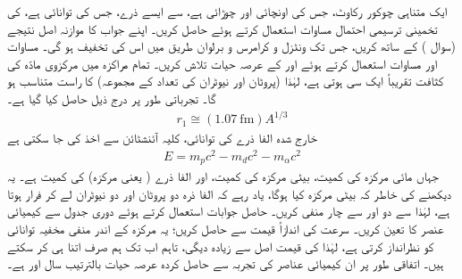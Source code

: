 ایک متناہی چوکور رکاوٹ، جس کی اونچائی  اور چوڑائی  ہے، سے ایسے ذرے، جس کی توانائی  ہے، کی تخمینی ترسیمی احتمال مساوات  استعمال کرتے ہوئے حاصل کریں۔ اپنے جواب کا موازنہ اصل نتیجے (سوال ) کے ساتھ کریں، جس تک ونٹزل و کرامرس و برلوان طریق  میں اس کی تخفیف ہو گی۔
مساوات  اور مساوات  استعمال کرتے ہوئے  اور  کے عرصہ حیات تلاش کریں۔ تمام مراکزہ میں مرکزوی مادّہ کی کثافت تقریباً ایک سی  ہوتی ہے، لہٰذا  (پروٹان اور نیوٹران کی تعداد کے مجموعہ)  کا راست متناسب ہو گا۔ تجرباتی طور پر درج ذیل حاصل کیا گیا ہے۔
\begin{align}
	r_{1}\cong(\SI{1.07}{\femto\meter})A^{1/3}
\end{align}
خارج شدہ الفا ذرے کی توانائی، کلیہ آئنشٹائن  سے اخذ کی جا سکتی ہے
\begin{align}
	E=m_{p}c^{2}-m_{d}c^{2}-m_{\alpha}c^{2}
\end{align}
جہاں  مائی مرکزہ کی کمیت،  بیٹی مرکزہ کی کمیت، اور  الفا ذرے ( یعنی  مرکزہ) کی کمیت ہے۔ یہ دیکھنے کی خاطر کہ بیٹی مرکزہ کیا ہوگا، یاد رہے کہ الفا ذرہ دو پروٹان اور دو نیوٹران لے کر فرار ہوتا ہے، لہٰذا  سے دو اور  سے چار منفی کریں۔ حاصل جوابات استعمال کرتے ہوئے دوری جدول سے کیمیائی عنصر کا تعین کریں۔ سرعت  کی اندازاً قیمت  سے حاصل کریں؛ یہ مرکزہ کے اندر منفی مخفیہ توانائی کو نظرانداز کرتی ہے، لہٰذا  کی قیمت اصل سے زیادہ دیگی، تاہم اب تک ہم صرف اتنا ہی کر سکتے ہیں۔ اتفاقی طور پر ان کیمیائی عناصر کی تجربہ سے حاصل کردہ عرصہ حیات بالترتیب  سال اور  ہے۔

